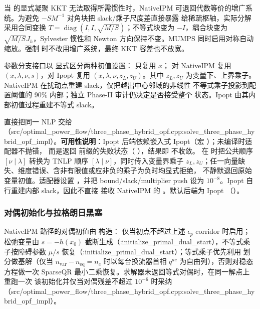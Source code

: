 当  的显式凝聚 KKT 无法取得所需惯性时，NativeIPM
可退回代数等价的增广系统。为避免 $-SM^{-1}$ 对角块把 slack/乘子尺度差直接暴露
给稀疏枢轴，实际分解采用合同变换
$T=\operatorname{diag}(I,I,\sqrt{M/S})$；不等式块变为 $-I$，耦合块变为
$\sqrt{M/S}J_h$，Sylvester 惯性和 Newton 方向保持不变。MUMPS 同时启用对称自动
缩放。强制  时不改用增广系统，最终 KKT 容差也不放宽。

参数分支接口以  显式区分两种初值设置：
 只复用 $x$； 对 NativeIPM 复用
$(x,\lambda,\nu,s)$，对 Ipopt 复用 $(x,\lambda,\nu,z_L,z_U)$。其中 $z_L,z_U$
为变量下、上界乘子。NativeIPM 在扰动点重建 slack，仅把越出中心邻域的非线性
不等式乘子投影到配置阈值的 90\% 内部；独立 Phase-II 审计仍决定是否接受整个
状态。Ipopt 由其内部初值过程重建不等式 slack。

 直接把同一 NLP 交给
（src/optimal\_power\_flow/three\_phase\_hybrid\_opf.cpp:solve\_three\_phase\_hybrid\_opf\_impl）。\textbf{可用性说明}：Ipopt
后端依赖嵌入式 Ipopt（宏 ）；未编译时适配器不抛错，
而是返回  前缀的失败状态（
），结果即
不收敛。 在
 时把公共顺序
$[\nu\mid\lambda]$ 转换为 TNLP 顺序 $[\lambda\mid\nu]$，同时传入变量界乘子
$z_L,z_U$；任一向量缺失、维度错误、含非有限值或应非负的乘子为负时均显式拒绝，
不静默退回原始变量初值。适配器设置 ，并把
bound/slack/multiplier push 设为 $10^{-8}$。Ipopt 自行重建内部 slack，因此不直接
接收 NativeIPM 的 。默认后端为 Ipopt
（）。

\subsubsection*{对偶初始化与拉格朗日黑塞}
NativeIPM 路径的对偶初值由  构造：
仅当初点不超过上述 $\epsilon_p$ corridor 时启用；
松弛变量由 $s=-h(x_0)$ 截断生成（:initialize\_primal\_dual\_start），不等式乘子按障碍参数
$\mu/s$ 恢复（:initialize\_primal\_dual\_start）；等式乘子优先利用
 划分做基解（仅当 $n_{\mathrm{var}}-n_{\mathrm{eq}}=n_c$
时以每台换流器首相 $q^{ac}$ 为自由列），否则对稳态方程做一次 SparseQR
最小二乘恢复。求解器未返回等式对偶时，在同一解点上重跑一次
该初始化并仅当对偶残差不超过 $10^{-6}$ 时采纳（src/optimal\_power\_flow/three\_phase\_hybrid\_opf.cpp:solve\_three\_phase\_hybrid\_opf\_impl）。

